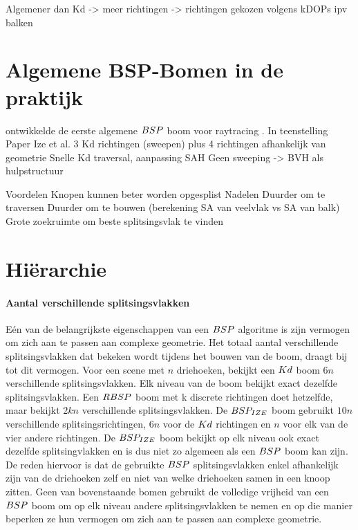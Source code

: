     Algemener dan Kd -> meer richtingen -> richtingen gekozen volgens
    kDOPs ipv balken

\section{Algemene BSP-Bomen in de praktijk}
    \authorIze{ } ontwikkelde de eerste algemene $BSP$ boom voor raytracing \cite{ize}. In teenstelling
    Paper Ize et al.
        3 Kd richtingen (sweepen) plus 4 richtingen afhankelijk van geometrie 
        Snelle Kd traversal, aanpassing SAH
        Geen sweeping -> BVH als hulpstructuur
    
    Voordelen
        Knopen kunnen beter worden opgesplist
    Nadelen
        Duurder om te traversen
        Duurder om te bouwen (berekening SA van veelvlak vs SA van balk)
        Grote zoekruimte om beste splitsingsvlak te vinden
 
\section{Hiërarchie}
\paragraph{Aantal verschillende splitsingsvlakken}
Eén van de belangrijkste eigenschappen van een $BSP$ algoritme is zijn vermogen om zich aan te passen aan complexe geometrie.
Het totaal aantal verschillende splitsingsvlakken dat bekeken wordt tijdens het bouwen van de boom, draagt bij tot dit vermogen.
Voor een scene met $n$ driehoeken, bekijkt een $Kd$ boom $6n$ verschillende splitsingsvlakken. 
Elk niveau van de boom bekijkt exact dezelfde splitsingsvlakken.
Een $RBSP$ boom met k discrete richtingen doet hetzelfde, maar bekijkt $2kn$ verschillende splitsingsvlakken. 
De $BSP_{IZE}$ boom gebruikt $10n$ verschillende splitsingsrichtingen, $6n$ voor de $Kd$ richtingen en $n$ voor elk van de vier andere richtingen.
De $BSP_{IZE}$ boom bekijkt op elk niveau ook exact dezelfde splitsingvlakken en is dus niet zo algemeen als een $BSP$ boom kan zijn. 
De reden hiervoor is dat de gebruikte $BSP$ splitsingsvlakken enkel afhankelijk zijn van de driehoeken zelf en niet van welke driehoeken samen in een knoop zitten.
Geen van bovenstaande bomen gebruikt de volledige vrijheid van een $BSP$ boom om op elk niveau andere splitsingsvlakken te nemen en op die manier beperken ze hun vermogen om zich aan te passen aan complexe geometrie.

